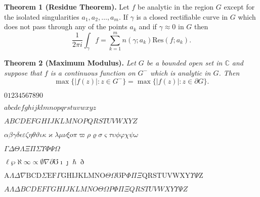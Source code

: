 
\noindent\textbf{Theorem 1 (Residue Theorem).}
Let $f$ be analytic in the region $G$ except for the isolated singularities $a_1,a_2,\ldots,a_m$. If $\gamma$ is a closed rectifiable curve in $G$ which does not pass through any of the points $a_k$ and if $\gamma\approx 0$ in $G$ then
\[
\frac{1}{2\pi i}\int_\gamma f = \sum_{k=1}^m n(\gamma;a_k) \text{Res}(f;a_k).
\]

\noindent\textbf{Theorem 2 (Maximum Modulus).}
\emph{Let $G$ be a bounded open set in $\mathbb{C}$ and suppose that $f$ is a continuous function on $G^-$ which is analytic in $G$. Then}
\[
\max\{|f(z)|:z\in G^-\}=\max \{|f(z)|:z\in \partial G \}.
\]

\vspace*{20pt}

\newcommand{\abc}{abcdefghijklmnopqrstuvwxyz}
\newcommand{\ABC}{ABCDEFGHIJKLMNOPQRSTUVWXYZ}
\newcommand{\alphabeta}{\alpha\beta\gamma\delta\epsilon\varepsilon\zeta\eta\theta\vartheta\iota\kappa\varkappa\lambda\mu\nu\xi o\pi\varpi\rho\varrho\sigma\varsigma\tau\upsilon\phi\varphi\chi\psi\omega}
\newcommand{\AlphaBeta}{\Gamma\Delta\Theta\Lambda\Xi\Pi\Sigma\Upsilon\Phi\Psi\Omega}

\small

\noindent$01234567890$

\noindent$\abc$

\noindent$\ABC$

\noindent$\alphabeta$

\noindent$\AlphaBeta$

\noindent$\ell\wp\aleph\infty\propto\emptyset\nabla\partial\mho\imath\jmath\hslash\eth$

\noindent$\mathrm{A} \Lambda \Delta \nabla \mathrm{B C D} \Sigma \mathrm{E F} \Gamma \mathrm{G H I J K L M N O} \Theta \Omega \mho \mathrm{P} \Phi \Pi \Xi \mathrm{Q R S T U V W X Y} \Upsilon \Psi \mathrm{Z} $ %

\noindent$\mathit{A \Lambda \Delta B C D E F \Gamma G H I J K L M N O \Theta \Omega P \Phi \Pi \Xi Q R S T U V W X Y \Upsilon \Psi Z }$






